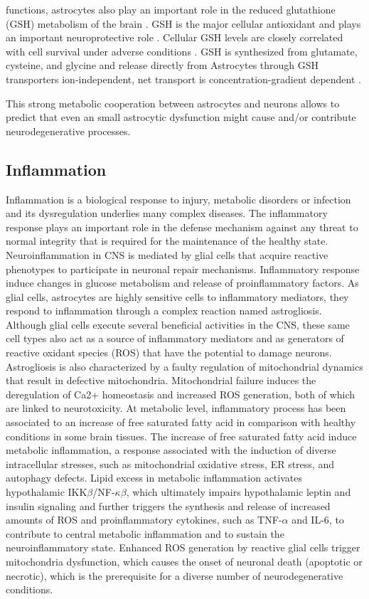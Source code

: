 functions, astrocytes also play an important role in the reduced glutathione (GSH) metabolism of the brain \cite{Raps1989}. GSH is the major cellular antioxidant and plays an important neuroprotective role \cite{Wang2000}. Cellular GSH levels are closely correlated with cell survival under adverse conditions \cite{Allaman2011}. GSH is synthesized from glutamate, cysteine, and glycine and release directly from Astrocytes through GSH transporters ion-independent, net transport is concentration-gradient dependent \cite{Raps1989,Wang2000}.

This strong metabolic cooperation between astrocytes and neurons allows to predict that even an small astrocytic dysfunction might cause and/or contribute neurodegenerative processes.

\subsection*{Inflammation}
Inflammation is a biological response to injury, metabolic disorders or infection and its dysregulation underlies many complex diseases. The inflammatory response plays an important role in the defense mechanism against any threat to normal integrity that is required for the maintenance of the healthy state. Neuroinflammation in CNS is mediated by glial cells that acquire reactive phenotypes to participate in neuronal repair mechanisms. Inflammatory response induce changes in glucose metabolism and release of proinflammatory factors.  As glial cells, astrocytes are highly sensitive cells to inflammatory mediators, they respond to inflammation through a complex reaction named astrogliosis. Although glial cells execute several beneficial activities in the CNS, these same cell types also act as a source of inflammatory mediators and as generators of reactive oxidant species (ROS) that have the potential to damage neurons. Astrogliosis is also characterized by a faulty regulation of mitochondrial dynamics that result in defective mitochondria.  Mitochondrial failure induces the deregulation of Ca2+ homeostasis and increased ROS generation, both of which are linked to neurotoxicity.  At metabolic level, inflammatory process has been associated to an increase of free saturated fatty acid in comparison with healthy conditions in some brain tissues. The increase of free saturated fatty acid induce metabolic inflammation, a response associated with the induction of diverse intracellular stresses, such as mitochondrial oxidative stress, ER stress, and autophagy defects.  Lipid excess in metabolic inflammation activates hypothalamic IKK$\beta$/NF-$\kappa\beta$, which ultimately impairs hypothalamic leptin and insulin signaling and further triggers the synthesis and release of increased amounts of ROS and proinflammatory cytokines, such as TNF-$\alpha$ and IL-6, to contribute to central metabolic inflammation and to sustain the neuroinflammatory state. Enhanced ROS generation by reactive glial cells trigger mitochondria dysfunction, which causes the onset of neuronal death (apoptotic or necrotic), which is the prerequisite for a diverse number of neurodegenerative conditions.



